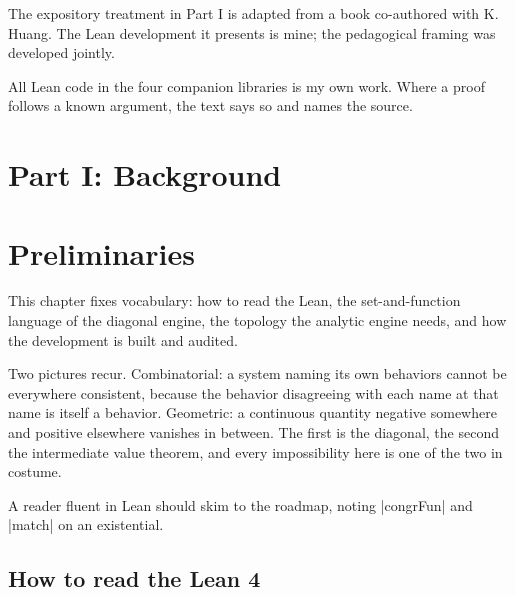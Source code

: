 \documentclass{memoir}
\begin{document}
The expository treatment in Part I is adapted from a book co-authored with
K. Huang. The Lean development it presents is mine; the pedagogical framing was
developed jointly.

All Lean code in the four companion libraries is my own work. Where a proof
follows a known argument, the text says so and names the source.





\chapter{Part I: Background}\label{Two--Schemas--of--Impossibility-005F-005F-005F--Machine--Checked--Limits--of--Trustworthy--Machine--Learning-005F-005F-005F--and--Why--They--Tighten--with--Capability----Part--I-005F-005F-005F--Background}




\chapter{Preliminaries}\label{Two--Schemas--of--Impossibility-005F-005F-005F--Machine--Checked--Limits--of--Trustworthy--Machine--Learning-005F-005F-005F--and--Why--They--Tighten--with--Capability----Preliminaries}

This chapter fixes vocabulary: how to read the Lean, the set-and-function
language of the diagonal engine, the topology the analytic engine needs, and how
the development is built and audited.

Two pictures recur. Combinatorial: a system naming its own behaviors cannot be
everywhere consistent, because the behavior disagreeing with each name at that
name is itself a behavior. Geometric: a continuous quantity negative somewhere
and positive elsewhere vanishes in between. The first is the diagonal, the
second the intermediate value theorem, and every impossibility here is one of
the two in costume.

A reader fluent in Lean should skim to the roadmap, noting \LeanVerb|congrFun| and
\LeanVerb|match| on an existential.



\section{How to read the Lean 4}\label{Two--Schemas--of--Impossibility-005F-005F-005F--Machine--Checked--Limits--of--Trustworthy--Machine--Learning-005F-005F-005F--and--Why--They--Tighten--with--Capability----Preliminaries----How--to--read--the--Lean--4}
\end{document}
